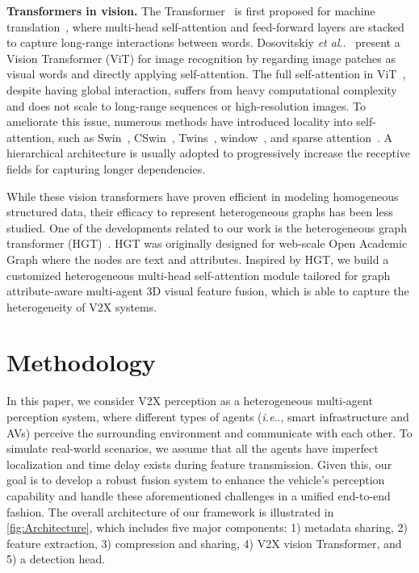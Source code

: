\documentclass[runningheads]{llncs}
\makeatletter
\DeclareRobustCommand\onedot{\futurelet\@let@token\@onedot}
\def\@onedot{\ifx\@let@token.\else.\null\fi\xspace}
\def\ie{\emph{i.e}\onedot} \def\Ie{\emph{I.e}\onedot}
\def\etal{\emph{et al}\onedot}
\makeatother
\begin{document}
\noindent\textbf{Transformers in vision.}
The Transformer~\cite{vaswani2017attention} is first proposed for machine translation~\cite{vaswani2017attention}, where multi-head self-attention and feed-forward layers are stacked to capture long-range interactions between words. Dosovitskiy \etal ~\cite{dosovitskiy2020image} present a Vision Transformer (ViT) for image recognition by regarding image patches as visual words and directly applying self-attention. The full self-attention in ViT~\cite{vaswani2017attention,dosovitskiy2020image,fan2022svt}, despite having global interaction, suffers from heavy computational complexity and does not scale to long-range sequences or high-resolution images. To ameliorate this issue, numerous methods have introduced locality into self-attention, such as Swin~\cite{liu2021swin}, CSwin~\cite{dong2021cswin}, Twins~\cite{chu2021twins}, window~\cite{wang2021uformer,tu2022maxim}, and sparse attention~\cite{vaswani2021scaling,tu2022maxvit,xu2022cobevt}. A hierarchical architecture is usually adopted to progressively increase the receptive fields for capturing longer dependencies.

While these vision transformers have proven efficient in modeling homogeneous structured data, their efficacy to represent heterogeneous graphs has been less studied. One of the developments related to our work is the heterogeneous graph transformer (HGT)~\cite{hu2020heterogeneous}. HGT was originally designed for web-scale Open Academic Graph where the nodes are text and attributes. Inspired by HGT, we build a customized heterogeneous multi-head self-attention module tailored for graph attribute-aware multi-agent 3D visual feature fusion, which is able to capture the heterogeneity of V2X systems.

\section{Methodology}
\label{sec:methodology}

In this paper, we consider V2X perception as a heterogeneous multi-agent perception system, where different types of agents (\ie, smart infrastructure and AVs) perceive the surrounding environment and communicate with each other. To simulate real-world scenarios, we assume that all the agents have imperfect localization and time delay exists during feature transmission.
Given this, our goal is to develop a robust fusion system to enhance the vehicle's perception capability and handle these aforementioned challenges in a unified end-to-end fashion. The overall architecture of our framework is illustrated in \cref{fig:Architecture}, which includes five major components: 1) metadata sharing, 2) feature extraction, 3) compression and sharing, 4) V2X vision Transformer, and 5) a detection head. 
\end{document}
